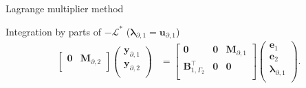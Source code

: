 \documentclass[aspectratio=169]{ISAE-Beamer}
\begin{document}
\begin{frame}{Lagrange multiplier method}
{\begin{block}{Integration by parts of $-\mathcal{L}^*$ ($\bm\lambda_{\partial, 1}=\bm{u}_{\partial, 1}$) }
\begin{equation*}
\begin{aligned}
\begin{bmatrix}
\mathbf{0} & \mathbf{M}_{\partial, 2} \\
\end{bmatrix}
\begin{pmatrix}
\mathbf{y}_{\partial, 1} \\
\mathbf{y}_{\partial, 2} \\
\end{pmatrix}
&= \begin{bmatrix}
\mathbf{0} & \mathbf{0} & \mathbf{M}_{\partial, 1} \\
\mathbf{B}_{1, \Gamma_2}^\top & \mathbf{0} & \mathbf{0} \\
\end{bmatrix}\begin{pmatrix}
\mathbf{e}_{1} \\
\mathbf{e}_{2} \\
{\bm{\lambda}}_{\partial, 1} \\
\end{pmatrix}.
\end{aligned}
\end{equation*}
\end{block}
}



\end{frame}
\end{document}
